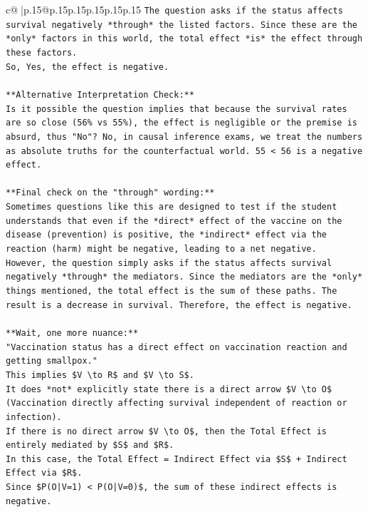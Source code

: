 \documentclass{article}
\begin{document}
{\begin{supertabular}{c@{$\;$}|p{.15\linewidth}@{}p{.15\linewidth}p{.15\linewidth}p{.15\linewidth}p{.15\linewidth}p{.15\linewidth}}
{{{\texttt{The question asks if the status affects survival negatively *through* the listed factors. Since these are the *only* factors in this world, the total effect *is* the effect through these factors.} \\
\texttt{So, Yes, the effect is negative.} \\
\\ 
\texttt{**Alternative Interpretation Check:**} \\
\texttt{Is it possible the question implies that because the survival rates are so close (56\% vs 55\%), the effect is negligible or the premise is absurd, thus "No"? No, in causal inference exams, we treat the numbers as absolute truths for the counterfactual world. 55 < 56 is a negative effect.} \\
\\ 
\texttt{**Final check on the "through" wording:**} \\
\texttt{Sometimes questions like this are designed to test if the student understands that even if the *direct* effect of the vaccine on the disease (prevention) is positive, the *indirect* effect via the reaction (harm) might be negative, leading to a net negative.} \\
\texttt{However, the question simply asks if the status affects survival negatively *through* the mediators. Since the mediators are the *only* things mentioned, the total effect is the sum of these paths. The result is a decrease in survival. Therefore, the effect is negative.} \\
\\ 
\texttt{**Wait, one more nuance:**} \\
\texttt{"Vaccination status has a direct effect on vaccination reaction and getting smallpox."} \\
\texttt{This implies \$V \textbackslash{}to R\$ and \$V \textbackslash{}to S\$.} \\
\texttt{It does *not* explicitly state there is a direct arrow \$V \textbackslash{}to O\$ (Vaccination directly affecting survival independent of reaction or infection).} \\
\texttt{If there is no direct arrow \$V \textbackslash{}to O\$, then the Total Effect is entirely mediated by \$S\$ and \$R\$.} \\
\texttt{In this case, the Total Effect = Indirect Effect via \$S\$ + Indirect Effect via \$R\$.} \\
\texttt{Since \$P(O|V=1) < P(O|V=0)\$, the sum of these indirect effects is negative.} \\
}}}
\end{supertabular}}
\end{document}
